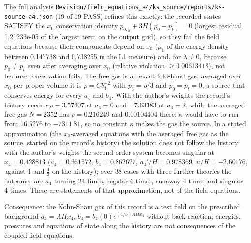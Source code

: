 \documentclass[11pt]{article}
\begin{document}
The full analysis \texttt{Revision\allowbreak{}/field\_e\allowbreak{}quations\allowbreak{}\_a4/ks\_s\allowbreak{}ource/re\allowbreak{}ports/ks\allowbreak{}-source-\allowbreak{}a4.json} (19 of 19 PASS) refines this exactly: the recorded states SATISFY the $x_0$ conservation identity $p_{0,y} + 3H(p_0 - p_t) = 0$ (largest residual 1.21233e-05 of the largest term on the output grid), so they fail the field equations because their components depend on $x_0$ ($\mu_1$ of the energy density between 0.147738 and 0.738255 in the L1 measure) and, for $\lambda \neq 0$, because $p_0 \neq p_t$ even after averaging over $x_0$ (relative violation $\geq 0.00613418$), not because conservation fails. The free gas is an exact fold-band gas: averaged over $x_0$ per proper volume it is $\bar\rho = Cb_4^{-2}$ with $p_3 = \rho/3$ and $p_0 = p_t = 0$, a source that conserves energy for every $a_4$ and $b_4$. With the author's weights the record's history needs $\kappa\rho = 3.57407$ at $a_4 = 0$ and $-7.63383$ at $a_4 = 2$, while the averaged free gas $N = 2352$ has $\bar\rho = 0.216249$ and $0.00104404$ there: $\kappa$ would have to run from 16.5276 to $-7311.81$, so no constant $\kappa$ makes the gas the source. In a stated approximation (the $x_0$-averaged equations with the averaged free gas as the source, started on the record's history) the solution does not follow the history: with the author's weights the second-order system becomes singular at $x_4 = 0.428813$ ($a_4 = 0.361572$, $b_4 = 0.862627$, $a_4'/H = 0.978369$, $u/H = -2.60176$, against 1 and $\frac43$ on the history); over 38 cases with three further theories the outcomes are $a_4$ turning 24 times, regular 6 times, runaway 4 times and singular 4 times. These are statements of that approximation, not of the field equations.

Consequence: the Kohn-Sham gas of this record is a test field on the prescribed background $a_4 = AHx_4$, $b_4 = b_4(0)e^{(4/3)AHx_4}$ without back-reaction; energies, pressures and equations of state along the history are not consequences of the coupled field equations.
\end{document}
